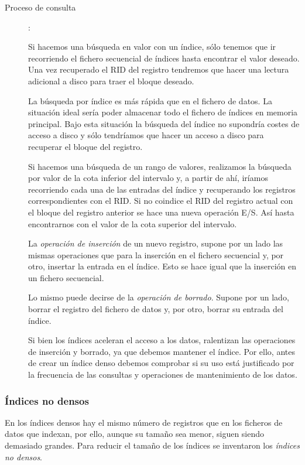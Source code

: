 \documentclass[10pt,a4paper,spanish]{report}
\begin{document}
\begin{description}
\item[Proceso de consulta]:


Si hacemos una búsqueda en valor con un índice, sólo tenemos que ir recorriendo el fichero secuencial de índices hasta encontrar el valor deseado. Una vez recuperado el RID del registro tendremos que hacer una lectura adicional a disco para traer el bloque deseado. 

La búsqueda por índice es más rápida que en el fichero de datos. La situación ideal sería poder almacenar todo el fichero de índices en memoria principal. Bajo esta situación la búsqueda del índice no supondría costes de acceso a disco y sólo tendríamos que hacer un acceso a disco para recuperar el bloque del registro.

Si hacemos una búsqueda de un rango de valores, realizamos la búsqueda por valor de la cota inferior del intervalo y, a partir de ahí, iríamos recorriendo cada una de las entradas del índice y recuperando los registros correspondientes con el RID. Si no coindice el RID del registro actual con el bloque del registro anterior se hace una nueva operación E/S. Así hasta encontrarnos con el valor de la cota superior del intervalo.

La \textcolor[rgb]{1,0.2,0.3}{\textit{operación de inserción}} de un nuevo registro, supone por un lado las mismas operaciones que para la inserción en el fichero secuencial y, por otro, insertar la entrada en el índice. Esto se hace igual que la inserción en un fichero secuencial.

Lo mismo puede decirse de la \textcolor[rgb]{1,0.2,0.3}{\textit{operación de borrado}}. Supone por un lado, borrar el registro del fichero de datos y, por otro, borrar su entrada del índice.

Si bien los índices aceleran el acceso a los datos, ralentizan las operaciones de inserción y borrado, ya que debemos mantener el índice. Por ello, antes de crear un índice denso debemos comprobar si su uso está justificado por la frecuencia de las consultas y operaciones de mantenimiento de los datos.
\end{description}

\textcolor[rgb]{1,0.2,0.3}{\subsubsection{Índices no densos}}
En los índices densos hay el mismo número de registros que en los ficheros de datos que indexan, por ello, aunque su tamaño sea menor, siguen siendo demasiado grandes. Para reducir el tamaño de los índices se inventaron los \textcolor[rgb]{1,0.2,0.3}{\textit{índices no densos}}. 
\end{document}
